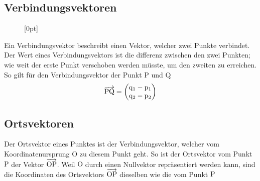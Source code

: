 \documentclass{article}
\begin{document}
\subsection{Verbindungsvektoren} 
\begin{wrapfigure}{r}{5cm}
  \centering
  \raisebox{-2.2cm}[0pt]{
  } 
\end{wrapfigure}
Ein Verbindungsvektor beschreibt einen Vektor, welcher zwei Punkte verbindet. Der Wert eines Verbindungsvektors ist die differenz zwischen den zwei Punkten; wie weit der erste Punkt verschoben werden müsste, um den zweiten zu erreichen. So gilt für den Verbindungsvektor der Punkt $\mathrm{P}$ und $\mathrm{Q}$
\[
 \overrightarrow{\mathrm{PQ}} =
 \begin{pmatrix}
  \mathrm{q}_1 - \mathrm{p}_1 \\
  \mathrm{q}_2 - \mathrm{p}_2
 \end{pmatrix}
\]
 
\subsection{Ortsvektoren}
Der Ortsvektor eines Punktes ist der Verbindungsvektor, welcher vom Koordinatenursprung $\mathrm{O}$ zu diesem Punkt geht. So ist der Ortsvektor vom Punkt $\mathrm{P}$ der Vektor $\overrightarrow{\mathrm{OP}}$. Weil $\mathrm{O}$ durch einen Nullvektor repräsentiert werden kann, sind die Koordinaten des Ortsvektors $\overrightarrow{\mathrm{OP}}$ dieselben wie die vom Punkt $\mathrm{P}$
 
\end{document}
